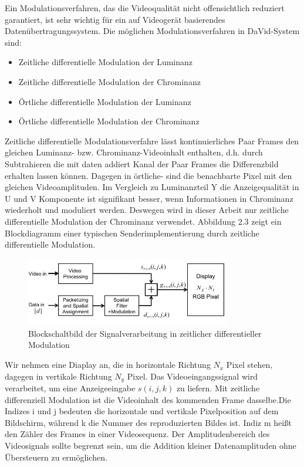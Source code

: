 Ein Modulationsverfahren, das die Videoqualität nicht offensichtlich reduziert garantiert, ist sehr wichtig für ein auf Videogerät basierendes Datenübertragungssystem. Die möglichen Modulationsverfahren in DaVid-System sind:
\begin{itemize}
	\item Zeitliche differentielle Modulation der Luminanz
	\item Zeitliche differentielle Modulation der Chrominanz
	\item Örtliche differentielle Modulation der Luminanz
	\item Örtliche differentielle Modulation der Chrominanz
\end{itemize}

Zeitliche differentielle Modulationsverfahre lässt kontinuierliches Paar Frames den gleichen Luminanz- bzw. Chrominanz-Videoinhalt enthalten, d.h. durch Subtrahieren die mit daten addiert Kanal der Paar Frames die Differenzbild erhalten lassen können. Dagegen in örtliche- sind die benachbarte Pixel mit den gleichen Videoamplituden. Im Vergleich zu Luminanzteil Y die Anzeigequalität in U und V Komponente ist signifikant besser, wenn Informationen in Chrominanz wiederholt und moduliert werden. Deswegen wird in dieser Arbeit nur zeitliche differentielle Modulation der Chrominanz verwendet. Abbildung 2.3 zeigt ein Blockdiagramm einer typischen Senderimplementierung durch zeitliche differentielle Modulation.

\begin{figure}[htb]
	\centering 
	\includegraphics[keepaspectratio,width=0.8\textwidth]{images/David2.jpg}
	\caption{Blockschaltbild der Signalverarbeitung in zeitlicher differentieller Modulation}
	\label{fig:David3}
\end{figure}

Wir nehmen eine Diaplay an, die in horizontale Richtung $N_x$ Pixel stehen, dagegen in vertikale Richtung $N_y$ Pixel. Das Videoeingangssignal wird verarbeitet, um eine Anzeigeeingabe $s(i,j,k)$ zu liefern. Mit zeitliche differenziell Modulation ist die Videoinhalt des kommenden Frame dasselbe.Die Indizes i und j bedeuten die horizontale und vertikale Pixelposition auf dem Bildschirm, während k die Nummer des reproduzierten Bildes ist.
Indiz m heißt den Zähler des Frames in einer Videosequenz. Der Amplitudenbereich des Videosignals sollte begrenzt sein, um die Addition kleiner Datenamplituden ohne Übersteuern zu ermöglichen.

